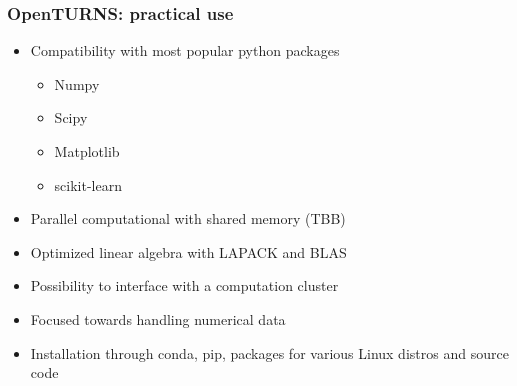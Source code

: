 \documentclass{beamer}
\begin{document}

\begin{frame}[containsverbatim]
  \frametitle{OpenTURNS: practical use}
  
  \small
  \begin{itemize}
  \item Compatibility with most popular python packages
  \begin{itemize}
  \scriptsize
  \item Numpy
  \item Scipy
  \item Matplotlib
  \item scikit-learn
  \end{itemize}
  \vspace{10pt}
  \item Parallel computational with shared memory (TBB)
  \vspace{10pt}
  \item Optimized linear algebra with LAPACK and BLAS 
  \vspace{10pt}
  \item Possibility to interface with a computation cluster
  \vspace{10pt}
  \item Focused towards handling numerical data
  \vspace{10pt}
  \item Installation through conda, pip, packages for various Linux distros and source code
  \end{itemize}
\end{frame}
  

\end{document}
